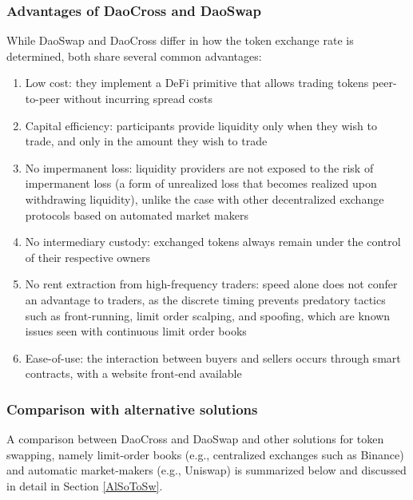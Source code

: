 \documentclass[11pt, reqno]{amsart}
\theoremstyle{definition}
\theoremstyle{remark}
\begin{document}
\subsubsection{Advantages of DaoCross and DaoSwap}
While DaoSwap and DaoCross differ in how the token exchange rate is determined,
both share several common advantages:
\begin{enumerate}
	\item Low cost:
	      they implement a DeFi primitive that allows trading tokens
          peer-to-peer without incurring spread costs
	\item Capital efficiency:
	      participants provide liquidity only when
	      they wish to trade, and only in the amount they wish to trade
	\item No impermanent loss:
	      liquidity providers are not exposed to the risk of impermanent loss
	      (a form of unrealized loss that becomes realized upon withdrawing
	      liquidity), unlike the case with other decentralized exchange protocols
	      based on automated market makers
	\item No intermediary custody:
	      exchanged tokens always remain under the control of their respective
	      owners
	\item No rent extraction from high-frequency traders:
	      speed alone does not confer an advantage to traders, as the discrete
	      timing prevents predatory tactics such as front-running, limit order
	      scalping, and spoofing, which are known issues seen with continuous
	      limit order books
	\item Ease-of-use: the interaction between buyers and sellers occurs
	      through smart contracts, with a website front-end available
\end{enumerate}

\subsubsection{Comparison with alternative solutions}
A comparison between DaoCross and DaoSwap and other solutions for token
swapping, namely limit-order books (e.g., centralized exchanges such as
Binance) and automatic market-makers (e.g., Uniswap) is summarized below
and discussed in detail in Section \ref{AlSoToSw}.
\end{document}
